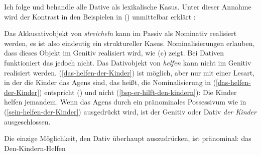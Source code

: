 Ich folge \citet[9]{Haider86} und behandle alle Dative als lexikalische Kasus. Unter dieser Annahme wird der
Kontrast in den Beispielen in () unmittelbar erklärt \citep[]{Haider86}:
\eal
{}

\label{das-helfen-der-Kinder}
\label{sein-helfen-der-Kinder}
\zl
Das Akkusativobjekt von \emph{streicheln} kann im Passiv als Nominativ realisiert werden,
es ist also eindeutig ein struktureller Kasus. Nominalisierungen erlauben, dass dieses Objekt im Genitiv realisiert wird, wie (c) zeigt. Bei Dativen funktioniert das jedoch nicht. Das Dativobjekt von \emph{helfen}
kann nicht im Genitiv realisiert werden. (\ref{das-helfen-der-Kinder}) ist möglich, aber nur
mit einer Lesart, in der die Kinder das Agens sind, das heißt, die Nominalisierung in
(\ref{das-helfen-der-Kinder}) entspricht () und nicht (\ref{bsp-er-hilft-den-kindern}):
\ea
Die Kinder helfen jemandem.
\z
Wenn das Agens durch ein pränominales Possessivum wie in (\ref{sein-helfen-der-Kinder}) ausgedrückt wird, ist der
Genitiv oder Dativ \emph{der Kinder} ausgeschlossen.

Die einzige Möglichkeit, den Dativ überhaupt auszudrücken, ist pränominal:
\ea
das Den-Kindern-Helfen
\z

